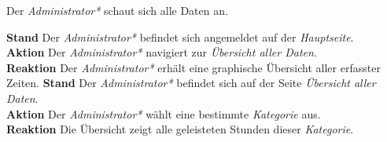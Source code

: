 \begin{requirements}
     Der \emph{Administrator*} schaut sich alle Daten an.
    \begin{requirements}
            \textbf{Stand} Der \emph{Administrator*} befindet sich angemeldet auf der \emph{Hauptseite}. \\
            \textbf{Aktion} Der \emph{Administrator*} navigiert zur \emph{Übersicht aller Daten}. \\
            \textbf{Reaktion} Der \emph{Administrator*} erhält eine graphische Übersicht aller erfasster Zeiten.
            \textbf{Stand} Der \emph{Administrator*} befindet sich auf der Seite \emph{Übersicht aller Daten}. \\
            \textbf{Aktion} Der \emph{Administrator*} wählt eine bestimmte \emph{Kategorie} aus. \\
            \textbf{Reaktion} Die Übersicht zeigt alle geleisteten Stunden dieser \emph{Kategorie}.
    \end{requirements}
            
    
\end{requirements}
